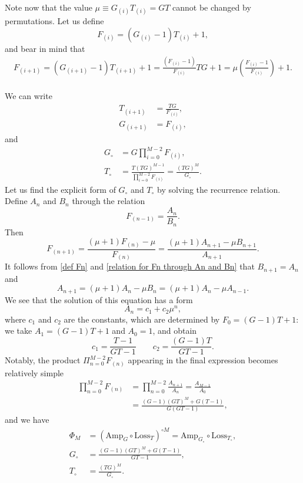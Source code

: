 \documentclass[a4paper]{article}
\renewcommand{\t}[1]{\mathrm{#1}}
\newcommand{\be}{\begin{equation}}
\newcommand{\ee}{\end{equation}}
\begin{document}
Note now that the value $\mu\equiv G_{(i)}T_{(i)}=G T$ cannot be changed by permutations. 
Let us define
\begin{equation}
    F_{(i)} = (G_{(i)}-1) T_{(i)}+1,
\end{equation}
and bear in mind that 
\be\begin{split}
    F_{(i+1)} = (G_{(i+1)}-1) T_{(i+1)}+1
    = \frac{(F_{(i)}-1)}{F_{(i)}} TG + 1
    =  \mu \left(\frac{F_{(i)}-1}{F_{(i)}}\right) + 1.
\end{split}
\ee\\
We can write
\be\begin{split}
T_{(i+1)} &= \frac{ T G}{F_{(i)}},\\
G_{(i+1)} &= F_{(i)},
\end{split}
\ee
and
\be
\begin{split}
    G_\circ &=  G \prod_{i=0}^{M-2}F_{(i)},\\
    T_\circ &=  \frac{T (TG)^{M-1}}{ \prod_{i=0}^{M-2} F_{(i)}}= \frac{(T G)^M}{G_\circ}.
\end{split}
\ee
Let us find the explicit form of $G_\circ$ and $T_\circ$ by solving the recurrence relation.
Define $A_{n}$ and $B_{n}$ through the relation
\be
F_{(n-1)} = \frac{A_{n}}{B_{n}}.
\label{def Fn}
\ee
Then
\be
F_{(n+1)} = \frac{(\mu+1) F_{(n)}-\mu}{F_{(n)}} = \frac{(\mu+1) A_{n+1}-\mu B_{n+1} }{A_{n+1}}.
\label{relation for Fn through An and Bn}
\ee
It follows from \eqref{def Fn} and \eqref{relation for Fn through An and Bn}  that $B_{n+1}= A_n $ and
\be
A_{n+1} = (\mu+1) A_n-\mu B_n = (\mu+1) A_n-\mu A_{n-1}.
\ee
We see that the solution of this equation has a form
\be
A_{n} = c_1 + c_2 \mu^n,
\ee
where $c_1$ and $c_2$ are the constants, which are determined by $F_0 =(G-1)T+1$: we take $A_1 = (G-1)T+1$ and $A_0 =1$, and obtain
\be
c_1 =\frac{T-1}{G T-1} \qquad c_2 = \frac{(G-1) T}{G T-1}.
\ee
Notably, the product $\Pi_{n=0}^{M-2} F_{(n)}$ appearing in the final expression becomes relatively simple
\be\begin{split}
    \prod_{n=0}^{M-2} F_{(n)} &= \prod_{n=0}^{M-2} \frac{A_{n+1}}{A_n} = \frac{A_{M-1}}{A_0}\\
    &= \frac{(G-1) (G T)^M+G (T-1)}{G (G T-1)},
\end{split}
\ee
and we have
\be\boxed{\begin{aligned}
\Phi_M &= (\t{Amp}_G\circ \t{Loss}_T)^{\circ M}= \t{Amp}_{G_\circ} \circ \t{Loss}_{T_\circ},\\
    G_\circ &= \frac{(G-1) (G T)^M+G (T-1)}{G T-1},\\
    T_\circ &= \frac{(TG)^M}{G_\circ}.
\end{aligned}}
\ee
\end{document}
